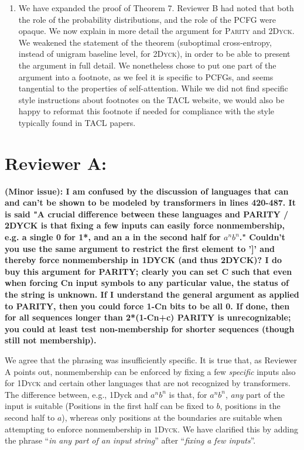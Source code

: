 \documentclass[11pt,a4paper]{article}
\newcounter{theorem}
\newcommand\response[1]{{\color{blue}#1}}
\newcommand\newtext[1]{``\textit{#1}''}
\newcommand\original[1]{\textbf{#1}}
\begin{document}
\begin{enumerate}
\item \response{We have expanded the proof of Theorem 7. Reviewer B had noted that both the role of the probability distributions, and the role of the PCFG were opaque. We now explain in more detail the argument for \textsc{Parity} and \textsc{2Dyck}. We weakened the statement of the theorem (suboptimal cross-entropy, instead of unigram baseline level, for \textsc{2Dyck}), in order to be able to present the argument in full detail. We nonetheless chose to put one part of the argument into a footnote, as we feel it is specific to PCFGs, and seems tangential to the properties of self-attention. While we did not find specific style instructions about footnotes on the TACL website, we would also be happy to reformat this footnote if needed for compliance with the style typically found in TACL papers.}
\end{enumerate}


\section{Reviewer A:}

\original{(Minor issue): I am confused by the discussion of languages that can and
can't be
shown to be modeled by transformers in lines 420-487. It is said "A
crucial difference between these languages and PARITY / 2DYCK is that
fixing a few inputs can easily force nonmembership, e.g. a single 0
for 1*, and an a in the second half for $a^n b^n$." Couldn't you use the
same argument to restrict the first element to ']' and thereby force
nonmembership in 1DYCK (and thus 2DYCK)? I do buy this
argument for PARITY; clearly you can set C such that even when forcing
Cn input symbols to any particular value, the status of the string is
unknown. If I understand the general argument as applied to PARITY,
then you could force 1-Cn bits to be all 0. If done, then for all
sequences longer than 2*(1-Cn+c) PARITY is unrecognizable; you could
at least test non-membership for shorter sequences (though still not
membership).}

\response{We agree that the phrasing was insufficiently specific. It is true that, as Reviewer A points out, nonmembership can be enforced by fixing a few \emph{specific} inputs also for \textsc{1Dyck} and certain other languages that are not recognized by transformers. The difference between, e.g., 1Dyck and $a^nb^n$ is that, for $a^nb^n$, \emph{any} part of the input is suitable (Positions in the first half can be fixed to $b$, positions in the second half to $a$), whereas only positions at the boundaries are suitable when attempting to enforce nonmembership in \textsc{1Dyck}. We have clarified this by adding the phrase \newtext{in any part of an input string} after \newtext{fixing a few inputs}.}
\end{document}
